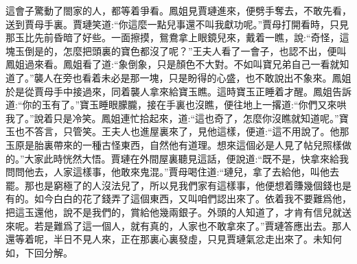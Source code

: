 \begin{parag}
    這會子驚動了閤家的人，都等着爭看。鳳姐見賈璉進來，便劈手奪去，不敢先看，送到賈母手裏。賈璉笑道:“你這麼一點兒事還不叫我獻功呢。”賈母打開看時，只見那玉比先前昏暗了好些。一面擦摸，鴛鴦拿上眼鏡兒來，戴着一瞧，說:“奇怪，這塊玉倒是的，怎麼把頭裏的寶色都沒了呢？”王夫人看了一會子，也認不出，便叫鳳姐過來看。鳳姐看了道:“象倒象，只是顏色不大對。不如叫寶兄弟自己一看就知道了。”襲人在旁也看着未必是那一塊，只是盼得的心盛，也不敢說出不象來。鳳姐於是從賈母手中接過來，同着襲人拿來給寶玉瞧。這時寶玉正睡着才醒。鳳姐告訴道:“你的玉有了。”寶玉睡眼朦朧，接在手裏也沒瞧，便往地上一撂道:“你們又來哄我了。”說着只是冷笑。鳳姐連忙拾起來，道:“這也奇了，怎麼你沒瞧就知道呢。”寶玉也不答言，只管笑。王夫人也進屋裏來了，見他這樣，便道:“這不用說了。他那玉原是胎裏帶來的一種古怪東西，自然他有道理。想來這個必是人見了帖兒照樣做的。”大家此時恍然大悟。賈璉在外間屋裏聽見這話，便說道:“既不是，快拿來給我問問他去，人家這樣事，他敢來鬼混。”賈母喝住道:“璉兒，拿了去給他，叫他去罷。那也是窮極了的人沒法兒了，所以見我們家有這樣事，他便想着賺幾個錢也是有的。如今白白的花了錢弄了這個東西，又叫咱們認出來了。依着我不要難爲他，把這玉還他，說不是我們的，賞給他幾兩銀子。外頭的人知道了，才肯有信兒就送來呢。若是難爲了這一個人，就有真的，人家也不敢拿來了。”賈璉答應出去。那人還等着呢，半日不見人來，正在那裏心裏發虛，只見賈璉氣忿走出來了。未知何如，下回分解。
\end{parag}